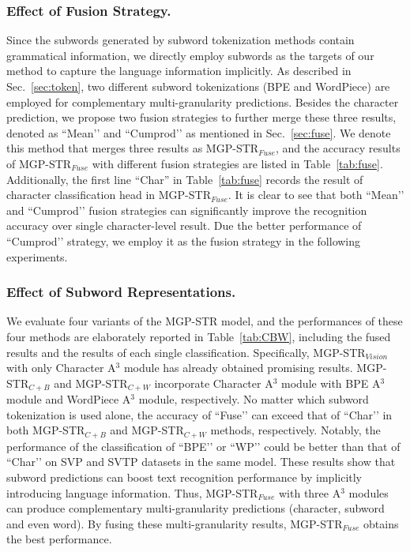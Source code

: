 \documentclass[runningheads]{llncs}
\begin{document}
\subsubsection{Effect of Fusion Strategy. }
Since the subwords generated by subword tokenization methods contain grammatical information, we directly employ subwords as the targets of our method to capture the language information implicitly. As described in Sec.~\ref{sec:token}, two different subword tokenizations (BPE and WordPiece) are employed for complementary multi-granularity predictions. 
Besides the character prediction, we propose two fusion strategies to further merge these three results, denoted as ``Mean’’ and ``Cumprod’’ as mentioned in Sec.~\ref{sec:fuse}. We denote this method that merges three results as MGP-STR$_{Fuse}$, and the accuracy results of MGP-STR$_{Fuse}$ with different fusion strategies are listed in Table~\ref{tab:fuse}. Additionally, the first line ``Char'' in Table~\ref{tab:fuse} records the result of character classification head in MGP-STR$_{Fuse}$. It is clear to see that both ``Mean’’ and ``Cumprod’’ fusion strategies can significantly improve the recognition accuracy over single character-level result. Due the better performance of ``Cumprod’’ strategy, we employ it as the fusion strategy in the following experiments.

\subsubsection{Effect of Subword Representations.}
We evaluate four variants of the MGP-STR model, and the performances of these four methods are elaborately reported in Table~\ref{tab:CBW}, including the fused results and the results of each single classification. Specifically, MGP-STR$_{Vision}$ with only Character A$^3$ module has already obtained promising results. MGP-STR$_{C+B}$ and MGP-STR$_{C+W}$ incorporate Character A$^3$ module with BPE A$^3$ module and WordPiece A$^3$ module, respectively. No matter which subword tokenization is used alone, the accuracy of ``Fuse’’ can exceed that of ``Char’’ in both MGP-STR$_{C+B}$ and MGP-STR$_{C+W}$ methods, respectively. Notably, the performance of the classification  of ``BPE’’ or ``WP’’ could be better than that of ``Char’’ on SVP and SVTP datasets in the same model. These results show that subword predictions can 
boost text recognition performance by implicitly introducing language information. Thus, MGP-STR$_{Fuse}$ with three A$^3$ modules can produce complementary multi-granularity predictions (character, subword and even word). By fusing these multi-granularity results, MGP-STR$_{Fuse}$ obtains the best performance. 
\end{document}
